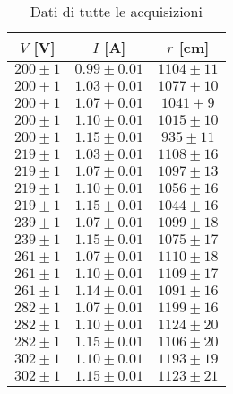 \begin{table}[hb]
\centering
\begin{tabular}{ccc}
	\toprule
$V$ [\si{\volt}] & 	$I$ [\si{\ampere}] & $r$ [\si{\cm}]\\
\midrule
$200	\pm 1 $	 	&	$0.99 \pm 0.01 $	&	$1104 \pm 	11$	\\
$200	\pm 1 $		&	$1.03 \pm 0.01 $	&	$1077 \pm 	10$	\\
$200	\pm 1 $		&	$1.07 \pm 0.01 $	&	$1041 \pm 	9$	\\
$200	\pm 1 $		&	$1.10 \pm 0.01 $	&	$1015 \pm 	10$	\\
$200	\pm 1 $		&	$1.15 \pm 0.01 $	&	$935 \pm  	11$	\\
$219	\pm 1 $		&	$1.03 \pm 0.01 $	&	$1108 \pm 	16$	\\
$219	\pm 1 $		&	$1.07 \pm 0.01 $	&	$1097 \pm 	13$	\\
$219	\pm 1 $		&	$1.10 \pm 0.01 $	&	$1056 \pm 	16$	\\
$219	\pm 1 $		&	$1.15 \pm 0.01 $	&	$1044 \pm 	16$	\\
$239	\pm 1 $		&	$1.07 \pm 0.01 $	&	$1099 \pm 	18$	\\
$239	\pm 1 $		&	$1.15 \pm 0.01 $	&	$1075 \pm 	17$	\\
$261	\pm 1 $		&	$1.07 \pm 0.01 $	&	$1110 \pm 	18$	\\
$261	\pm 1 $		&	$1.10 \pm 0.01 $	&	$1109 \pm 	17$	\\
$261	\pm 1 $		&	$1.14 \pm 0.01 $	&	$1091 \pm 	16$	\\
$282	\pm 1 $		&	$1.07 \pm 0.01 $	&	$1199 \pm 	16$	\\
$282	\pm 1 $		&	$1.10 \pm 0.01 $	&	$1124 \pm 	20$	\\
$282	\pm 1 $		&	$1.15 \pm 0.01 $	&	$1106 \pm 	20$	\\
$302	\pm 1 $		&	$1.10 \pm 0.01 $	&	$1193 \pm 	19$	\\
$302	\pm 1 $		&	$1.15 \pm 0.01 $	&	$1123 \pm 	21$	\\
\bottomrule
\end{tabular}
\caption{Dati di tutte le acquisizioni}
\label{dati_raggi}
\end{table}

	
	
	
	
	
	
	
	
	
	
	
	
	
	
	
	
	
	
	
	
	
	